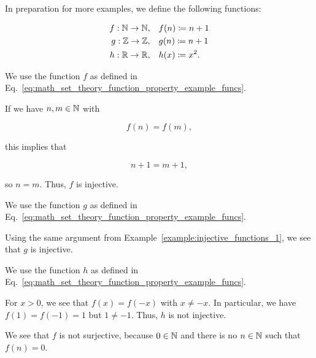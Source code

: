 \noindent
In preparation for more examples, we define the following functions:

\begin{align}
    f:\mathbb{N}\to\mathbb{N},\quad &f(n) \coloneqq{} n+1 \nonumber\\
    g:\mathbb{Z}\to\mathbb{Z},\quad &g(n) \coloneqq{} n+1 \nonumber\\
    h:\mathbb{R}\to\mathbb{R},\quad &h(x) \coloneqq{} x^{2}.
    \label{eq:math_set_theory_function_property_example_funcs}
\end{align}



\begin{example}
\label{example:injective_functions_1}
We use the \gls{function} $f$ as defined in
Eq.~\eqref{eq:math_set_theory_function_property_example_funcs}.

If we have $n,m\in\mathbb{N}$ with

\begin{equation}
    f(n) = f(m),
\end{equation}

\noindent
this implies that

\begin{equation}
    n+1 = m+1,
\end{equation}

\noindent
so $n = m$.
Thus, $f$ is \gls{injective}.
\end{example}

\begin{example}
\label{example:injective_functions_2}
We use the \gls{function} $g$ as defined in
Eq.~\eqref{eq:math_set_theory_function_property_example_funcs}.

Using the same argument from Example~\ref{example:injective_functions_1},
we see that $g$ is \gls{injective}.
\end{example}

\begin{example}
\label{example:injective_functions_3}
We use the \gls{function} $h$ as defined in
Eq.~\eqref{eq:math_set_theory_function_property_example_funcs}.

For $x>0$, we see that $f(x) = f(-x)$ with $x\ne -x$.
In particular, we have $f(1) = f(-1) = 1$ but $1\ne-1$.
Thus, $h$ is not \gls{injective}.
\end{example}



\begin{example}
\label{example:surjective_functions_1}
We see that $f$ is not \gls{surjective},
because $0\in\mathbb{N}$ and there is no $n\in\mathbb{N}$ such that $f(n) = 0$.
\end{example}

